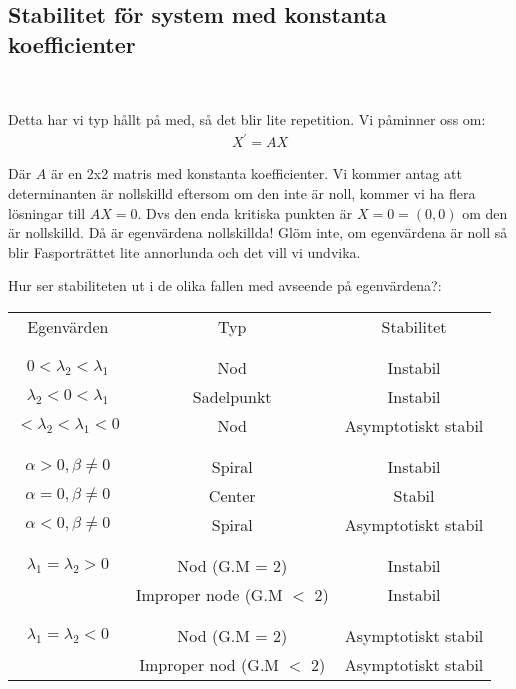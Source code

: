 \subsection{Stabilitet för system med konstanta koefficienter}\hfill\\
\par\bigskip
\noindent Detta har vi typ hållt på med, så det blir lite repetition. Vi påminner oss om:
\begin{equation*}
  \begin{gathered}
    X^{\prime} = AX
  \end{gathered}
\end{equation*}\par
\noindent Där $A$ är en 2x2 matris med konstanta koefficienter. Vi kommer antag att determinanten är nollskilld eftersom om den inte är noll, kommer vi ha flera lösningar till $AX = 0$. Dvs den enda kritiska punkten är $X = 0 = (0,0)$ om den är nollskilld. Då är egenvärdena nollskillda! Glöm inte, om egenvärdena är noll så blir Fasporträttet lite annorlunda och det vill vi undvika. 
\par\bigskip
\noindent Hur ser stabiliteten ut i de olika fallen med avseende på egenvärdena?:
\par\bigskip
\begin{center}
  \begin{tabular}{c|c|c}
    Egenvärden&Typ&Stabilitet\\\\
    \hline\\
    $0<\lambda_2<\lambda_1$&Nod&Instabil\\
    $\lambda_2<0<\lambda_1$&Sadelpunkt&Instabil\\
    $<\lambda_2<\lambda_1<0$&Nod&Asymptotiskt stabil\\\\
    \hline\\
    $\alpha>0, \beta\neq0$&Spiral&Instabil\\
    $\alpha=0, \beta\neq0$&Center&Stabil\\
    $\alpha<0, \beta\neq0$&Spiral&Asymptotiskt stabil\\\\
    \hline\\
    $\lambda_1=\lambda_2 > 0$&Nod (G.M = 2)&Instabil\\
    &Improper node (G.M $<$ 2)&Instabil\\\\
    \hline\\
    $\lambda_1=\lambda_2<0$&Nod (G.M = 2)&Asymptotiskt stabil\\
    &Improper nod (G.M $<$ 2)&Asymptotiskt stabil\\
  \end{tabular}
\end{center}
